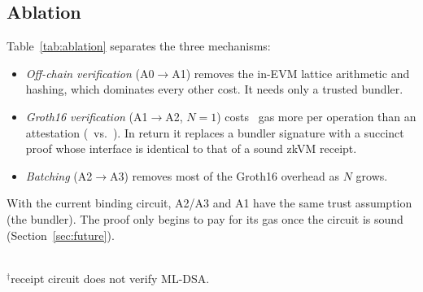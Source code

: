 \documentclass[conference]{IEEEtran}
\begin{document}
\subsection{Ablation}
Table~\ref{tab:ablation} separates the three mechanisms:
\begin{itemize}
\item \emph{Off-chain verification} (A0$\to$A1) removes the in-EVM lattice arithmetic and hashing, which dominates every other cost. It needs only a trusted bundler.
\item \emph{Groth16 verification} (A1$\to$A2, $N=1$) costs \GrothOverhead\ gas more per operation than an attestation (\PerOpGas\ vs.\ \AttestOneGas). In return it replaces a bundler signature with a succinct proof whose interface is identical to that of a sound zkVM receipt.
\item \emph{Batching} (A2$\to$A3) removes most of the Groth16 overhead as $N$ grows.
\end{itemize}
With the current binding circuit, A2/A3 and A1 have the same trust assumption (the bundler). The proof only begins to pay for its gas once the circuit is sound (Section~\ref{sec:future}).

\begin{table}[t]
\centering
\caption{Ablation: gas per operation (mean of \Repeats\ runs).}\label{tab:ablation}
\scriptsize
\resizebox{\columnwidth}{!}{}\\[2pt]
\footnotesize $^\dagger$receipt circuit does not verify ML-DSA.
\end{table}
\end{document}
